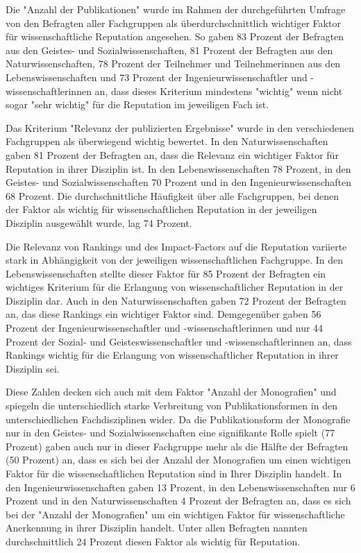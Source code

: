Die "Anzahl der Publikationen" wurde im Rahmen der durchgeführten Umfrage von den Befragten aller Fachgruppen als überdurchschnittlich wichtiger Faktor für wissenschaftliche Reputation angesehen. So gaben 83 Prozent der Befragten aus den Geistes- und Sozialwissenschaften, 81 Prozent der Befragten aus den Naturwissenschaften, 78 Prozent der Teilnehmer und Teilnehmerinnen aus den Lebenswissenschaften und 73 Prozent der Ingenieurwissenschaftler und -wissenschaftlerinnen an, dass dieses Kriterium mindestens "wichtig" wenn nicht sogar "sehr wichtig" für die Reputation im jeweiligen Fach ist.

Das Kriterium "Relevanz der publizierten Ergebnisse" wurde in den verschiedenen Fachgruppen als überwiegend wichtig bewertet. In den Naturwissenschaften gaben 81 Prozent der Befragten an, dass die Relevanz ein wichtiger Faktor für Reputation in ihrer Disziplin ist. In den Lebenswissenschaften 78 Prozent, in den Geistes- und Sozialwissenschaften 70 Prozent und in den Ingenieurwissenschaften 68 Prozent. Die durchschnittliche Häufigkeit über alle Fachgruppen, bei denen der Faktor als wichtig für wissenschaftlichen Reputation in der jeweiligen Disziplin ausgewählt wurde, lag 74 Prozent.

Die Relevanz von Rankings und des Impact-Factors auf die Reputation variierte stark in Abhängigkeit von der jeweiligen wissenschaftlichen Fachgruppe. In den Lebenswissenschaften stellte dieser Faktor für 85 Prozent der Befragten ein wichtiges Kriterium für die Erlangung von wissenschaftlicher Reputation in der Disziplin dar. Auch in den Naturwissenschaften gaben 72 Prozent der Befragten an, das diese Rankings ein wichtiger Faktor sind. Demgegenüber gaben 56 Prozent der Ingenieurwissenschaftler und -wissenschaftlerinnen und nur 44 Prozent der Sozial- und Geisteswissenschaftler und -wissenschaftlerinnen an, dass Rankings wichtig für die Erlangung von wissenschaftlicher Reputation in ihrer Disziplin sei.

Diese Zahlen decken sich auch mit dem Faktor "Anzahl der Monografien" und spiegeln die unterschiedlich starke Verbreitung von Publikationsformen in den unterschiedlichen Fachdisziplinen wider. Da die Publikationsform der Monografie nur in den Geistes- und Sozialwissenschaften eine signifikante Rolle spielt (77 Prozent) gaben auch nur in dieser Fachgruppe mehr als die Hälfte der Befragten (50 Prozent) an, dass es sich bei der Anzahl der Monografien um einen wichtigen Faktor für die wissenschaftlichen Reputation sind in Ihrer Disziplin handelt. In den Ingenieurwissenschaften gaben 13 Prozent, in den Lebenswissenschaften nur 6 Prozent und in den Naturwissenschaften 4 Prozent der Befragten an, dass es sich bei der "Anzahl der Monografien" um ein wichtigen Faktor für wissenschaftliche Anerkennung in ihrer Disziplin handelt. Unter allen Befragten nannten durchschnittlich 24 Prozent diesen Faktor als wichtig für Reputation.

